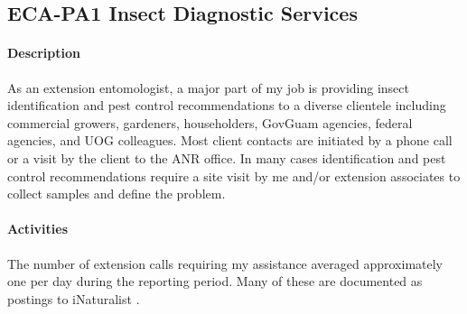 \subsection{ECA-PA1 Insect Diagnostic Services}
\begin{refsection}

\paragraph{Description}	
As an extension entomologist, a major part of my job is providing
insect identification and pest control recommendations to a diverse
clientele including commercial growers, gardeners, householders, GovGuam
agencies, federal agencies, and UOG colleagues. Most client contacts
are initiated by a phone call or a visit by the client to the ANR
office. In many cases identification and pest control recommendations
require a site visit by me and/or extension associates to collect
samples and define the problem.

\paragraph{Activities}
The number of extension calls requiring my assistance averaged approximately
one per day during the reporting period. Many of these are documented
as postings to iNaturalist \cite{moore_inat_since_2020-06-15}.

\printbibliography[heading=none]
\end{refsection}

